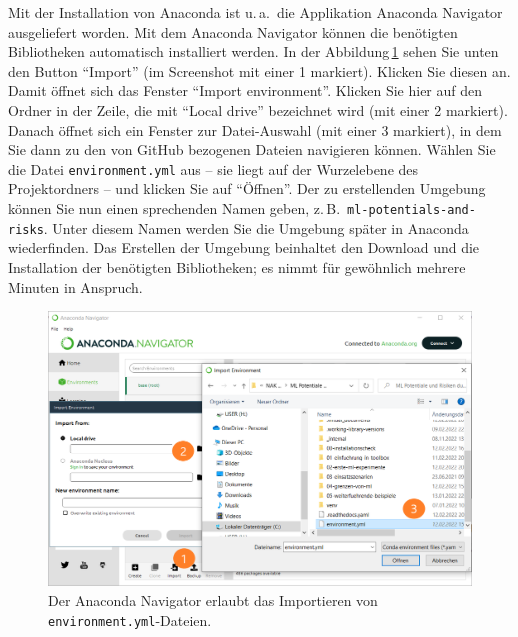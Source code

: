 \documentclass{tufte-handout}
\begin{document}
Mit der Installation von Anaconda ist u.\,a.\ die Applikation Anaconda Navigator ausgeliefert worden.
Mit dem Anaconda Navigator können die benötigten Bibliotheken automatisch installiert werden.
In der Abbildung\,\ref{fig:anaconda-navigator} sehen Sie unten den Button \enquote{Import}
(im Screenshot mit einer 1 markiert).
Klicken Sie diesen an.
Damit öffnet sich das Fenster \enquote{Import environment}.
Klicken Sie hier auf den Ordner in der Zeile, die mit 
\enquote{Local drive}
bezeichnet wird (mit einer 2 markiert).
Danach öffnet sich ein Fenster zur Datei-Auswahl
(mit einer 3 markiert),
in dem Sie dann zu den von GitHub bezogenen Dateien navigieren können.
Wählen Sie die Datei \texttt{environment.yml} aus
-- sie liegt auf der Wurzelebene des Projektordners --
und klicken Sie auf \enquote{Öffnen}.
Der zu erstellenden Umgebung können Sie nun einen sprechenden Namen geben, z.\,B.\ \texttt{ml-potentials-and-risks}.
Unter diesem Namen werden Sie die Umgebung später in Anaconda wiederfinden.
Das Erstellen der Umgebung beinhaltet den Download und die Installation der benötigten Bibliotheken; es nimmt für gewöhnlich mehrere Minuten in Anspruch.

\begin{figure}[h]
  \includegraphics{anaconda-navigator-import-new-environment--mit-reihenfolge}
  \caption{Der Anaconda Navigator erlaubt das Importieren von \texttt{environment.yml}-Dateien.}%
\label{fig:anaconda-navigator}
\end{figure}
\end{document}
